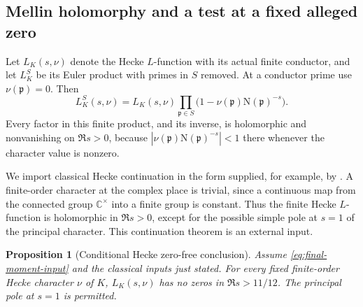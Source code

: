 \documentclass[11pt]{article}
\numberwithin{equation}{section}
\newtheorem{proposition}[theorem]{Proposition}
\theoremstyle{definition}
\theoremstyle{remark}
\newcommand{\N}{\mathrm N}
\begin{document}
\subsection{Mellin holomorphy and a test at a fixed alleged zero}

Let \(L_K(s,\nu)\) denote the Hecke \(L\)-function with its actual
finite conductor, and let \(L_K^S\) be its Euler product with primes
in \(S\) removed. At a conductor prime use \(\nu(\mathfrak p)=0\).
Then
\begin{equation}\label{eq:final-missing-factors}
 L_K^S(s,\nu)=L_K(s,\nu)
       \prod_{\mathfrak p\in S}
       \bigl(1-\nu(\mathfrak p)\N(\mathfrak p)^{-s}\bigr).
\end{equation}
Every factor in this finite product, and its inverse, is holomorphic and
nonvanishing on \(\Re s>0\), because
\(|\nu(\mathfrak p)\N(\mathfrak p)^{-s}|<1\) there whenever
the character value is nonzero.

We import classical Hecke continuation in the form supplied, for
example, by \cite[Theorem 5.22 and Section 5.11]{Poonen}. A finite-order
character at the complex place is trivial, since a continuous map from
the connected group \(\mathbb C^\times\) into a finite group is
constant. Thus the finite Hecke \(L\)-function is holomorphic in
\(\Re s>0\), except for the possible simple pole at \(s=1\) of the
principal character. This continuation theorem is an external input.

\begin{proposition}[Conditional Hecke zero-free conclusion]
\label{prop:final-hecke}
Assume \eqref{eq:final-moment-input} and the classical inputs just
stated. For every fixed finite-order Hecke character \(\nu\) of
\(K\), \(L_K(s,\nu)\) has no zeros in
\(\Re s>11/12\). The principal pole at \(s=1\) is permitted.
\end{proposition}
\end{document}
